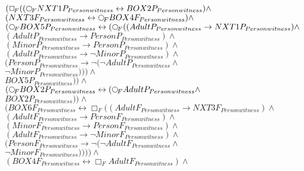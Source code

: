 \documentclass[a4paper,10pt]{article}
\begin{document}
 \newcommand{\nxt}{{\ensuremath\raisebox{0.25ex}{\text{\scriptsize$\bigcirc$}}}}
\newcommand{\Rdiamond}{\Diamond_{\!F}}
\newcommand{\Rbox}{\Box_{\!F}}
\newcommand{\Rnext}{\nxt_{\!F}}
\newcommand{\Ldiamond}{\Diamond_{\!P}}
\newcommand{\Lbox}{\Box_{\!P}}
\newcommand{\Lnext}{\nxt_{\!P}}
\newcommand{\SVdiamond}{\mathop{\ooalign{$\Diamond$ \cr \kern0.5ex
    \raisebox{0.35ex}{\scalebox{0.7}{$*$}}} \kern-0.9ex}}
\newcommand{\SVbox}{\mathop{\ooalign{$\Box$ \cr \kern0.42ex
    \raisebox{0.3ex}{\scalebox{0.7}{$*$}}} \kern-0.9ex}}


$( \Rbox (( \Rnext NXT1P_{Personwitness} \leftrightarrow BOX2P_{Personwitness}) \land $ \\ 
 $ (NXT3F_{Personwitness} \leftrightarrow  \Rnext BOX4F_{Personwitness}) \land $ \\ 
 $ ( \Rnext BOX5P_{Personwitness} \leftrightarrow ( \Rnext ((AdultP_{Personwitness} \rightarrow NXT1P_{Personwitness}) \land $ \\ 
 $ (AdultP_{Personwitness} \rightarrow PersonP_{Personwitness}) \land $ \\ 
 $ (MinorP_{Personwitness} \rightarrow PersonP_{Personwitness}) \land $ \\ 
 $ (AdultP_{Personwitness} \rightarrow  \lnot MinorP_{Personwitness}) \land $ \\ 
 $ (PersonP_{Personwitness} \rightarrow  \lnot ( \lnot AdultP_{Personwitness} \land $ \\ 
 $  \lnot MinorP_{Personwitness}))) \land $ \\ 
 $ BOX5P_{Personwitness})) \land $ \\ 
 $ ( \Rnext BOX2P_{Personwitness} \leftrightarrow ( \Rnext AdultP_{Personwitness} \land $ \\ 
 $ BOX2P_{Personwitness})) \land $ \\ 
 $ (BOX6F_{Personwitness} \leftrightarrow  \Rbox ((AdultF_{Personwitness} \rightarrow NXT3F_{Personwitness}) \land $ \\ 
 $ (AdultF_{Personwitness} \rightarrow PersonF_{Personwitness}) \land $ \\ 
 $ (MinorF_{Personwitness} \rightarrow PersonF_{Personwitness}) \land $ \\ 
 $ (AdultF_{Personwitness} \rightarrow  \lnot MinorF_{Personwitness}) \land $ \\ 
 $ (PersonF_{Personwitness} \rightarrow  \lnot ( \lnot AdultF_{Personwitness} \land $ \\ 
 $  \lnot MinorF_{Personwitness})))) \land $ \\ 
 $ (BOX4F_{Personwitness} \leftrightarrow  \Rbox AdultF_{Personwitness}) \land $ \\ 
\end{document}
